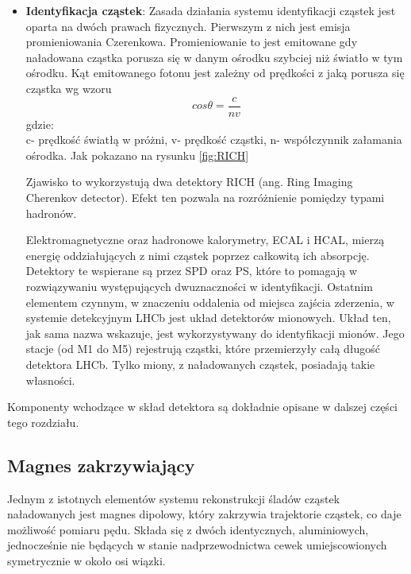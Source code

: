 \begin{itemize}
\item \textbf{Identyfikacja cząstek}: Zasada działania systemu identyfikacji cząstek jest oparta na dwóch prawach fizycznych. Pierwszym z nich jest emisja promieniowania Czerenkowa. Promieniowanie to jest emitowane gdy naładowana cząstka porusza się w danym ośrodku szybciej niż światło w tym ośrodku. Kąt emitowanego fotonu jest zależny od prędkości z jaką porusza się cząstka wg wzoru
\begin{equation}
 cos\theta=\frac{c}{n v}
\end{equation}
gdzie:\\
c- prędkość światłą w próżni, v- prędkość cząstki, n- współczynnik załamania ośrodka. Jak pokazano na rysunku \ref{fig:RICH} 

 Zjawisko to wykorzystują  dwa detektory RICH (ang. Ring Imaging Cherenkov detector). Efekt ten pozwala na rozróżnienie pomiędzy typami hadronów. 

Elektromagnetyczne oraz hadronowe kalorymetry, ECAL i HCAL, mierzą energię oddziałujących z nimi cząstek poprzez całkowitą ich absorpcję. Detektory te wspierane są przez SPD oraz PS, które to pomagają w rozwiązywaniu występujących dwuznaczności w identyfikacji. Ostatnim elementem czynnym, w znaczeniu oddalenia od miejsca  zajścia zderzenia, w systemie detekcyjnym LHCb jest układ detektorów mionowych. Układ ten, jak sama nazwa wskazuje, jest wykorzystywany do identyfikacji mionów. Jego stacje (od M1 do M5) rejestrują cząstki, które przemierzyły całą długość detektora LHCb. Tylko miony, z naładowanych cząstek, posiadają takie własności. 
\end{itemize} 
Komponenty wchodzące w skład detektora są dokładnie opisane w dalszej części tego rozdziału. 

\subsection{Magnes zakrzywiający}
Jednym z istotnych elementów systemu rekonstrukcji śladów cząstek naładowanych jest magnes dipolowy, który zakrzywia trajektorie cząstek, co daje możliwość pomiaru pędu. Składa się z dwóch identycznych, aluminiowych, jednocześnie nie będących w stanie nadprzewodnictwa cewek umiejscowionych symetrycznie w około osi wiązki.

